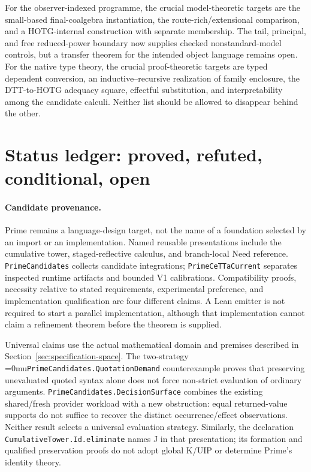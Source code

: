 \documentclass[11pt]{article}
\newcommand{\leanname}[1]{\textup{\Urlmuskip=0mu\relax\nolinkurl{#1}}}
\theoremstyle{definition}
\theoremstyle{remark}
\begin{document}
For the observer-indexed programme, the crucial model-theoretic targets are the
small-based final-coalgebra instantiation, the route-rich/extensional comparison,
and a HOTG-internal construction with separate membership.  The tail,
principal, and free reduced-power boundary now supplies checked nonstandard-model
controls, but a transfer theorem for the intended object language remains open.
For the native type theory, the crucial proof-theoretic targets are typed
dependent conversion, an inductive--recursive realization of family enclosure,
the DTT-to-HOTG adequacy square, effectful substitution, and interpretability
among the candidate calculi.  Neither list should be allowed to disappear behind
the other.

\section{Status ledger: proved, refuted, conditional, open}
\label{sec:status-ledger}

\paragraph{Candidate provenance.}
Prime remains a language-design target, not the name of a foundation selected
by an import or an implementation. Named reusable presentations include the
cumulative tower, staged-reflective calculus, and branch-local Need reference.
\texttt{PrimeCandidates} collects candidate integrations;
\texttt{PrimeCeTTaCurrent} separates inspected runtime artifacts and bounded
V1 calibrations. Compatibility proofs, necessity relative to stated
requirements, experimental preference, and implementation qualification are
four different claims. A Lean emitter is not required to start a parallel
implementation, although that implementation cannot claim a refinement theorem
before the theorem is supplied.

Universal claims use the actual mathematical domain and premises described in
Section~\ref{sec:specification-space}. The two-strategy
\leanname{PrimeCandidates.QuotationDemand} counterexample proves that
preserving unevaluated quoted syntax alone does not force non-strict
evaluation of ordinary arguments.
\texttt{PrimeCandidates.DecisionSurface} combines the existing shared/fresh
provider workload with a new obstruction: equal returned-value supports do
not suffice to recover the distinct occurrence/effect observations. Neither
result selects a universal evaluation strategy. Similarly, the declaration
\texttt{CumulativeTower.Id.eliminate} names J in that presentation; its
formation and qualified preservation proofs do not adopt global K/UIP or
determine Prime's identity theory.
\end{document}
